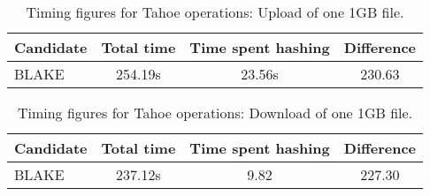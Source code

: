 \begin{table}[h]
  \centering
  \begin{tabular}{ | l | c | c | c | }
    \hline
    Candidate & Total time & Time spent hashing & Difference \\ \hline
    BLAKE     & 254.19s    & 23.56s             & 230.63     \\ \hline 
  \end{tabular}
  \caption{Timing figures for Tahoe operations: Upload of one 1GB file.}
  \label{tbl:hashingtimes:put1gb}
\end{table}

\begin{table}[h]
  \centering
  \begin{tabular}{ | l | c | c | c | }
    \hline
    Candidate & Total time & Time spent hashing & Difference \\ \hline
    BLAKE     & 237.12s    & 9.82               & 227.30     \\ \hline 
  \end{tabular}
  \caption{Timing figures for Tahoe operations: Download of one 1GB file.}
  \label{tbl:hashingtimes:get1gb}
\end{table}
